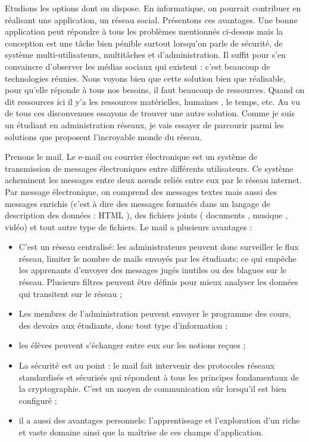 \documentclass[a4paper,12pt,french]{report} %
\begin{document}
	Etudions les options dont on dispose. En informatique, on pourrait contribuer en réalisant une application, un réseau social.
Présentons ces avantages. Une bonne application peut répondre à tous les problèmes mentionnés ci-dessus mais la conception est une tâche bien pénible surtout lorsqu'on parle de sécurité, de système multi-utilisateurs, multitâches et d'administration. Il suffit pour s'en convaincre d'observer les médias sociaux qui existent : c'est beaucoup %
de technologies réunies. Nous voyons bien que cette solution bien que réalisable, pour qu'elle réponde à tous nos besoins, il faut beaucoup de ressources. Quand on dit ressources ici il y'a les ressources matérielles, humaines , le temps, etc. Au vu de tous ces disconvenues essayons de trouver une autre solution. Comme je suis un étudiant en administration réseaux, je vais essayer de parcourir parmi les solutions que proposent l'incroyable monde du réseau.

	Prenons le mail. Le e-mail ou courrier électronique est un système de transmission de messages électroniques entre différents utilisateurs. Ce système acheminent les messages entre deux nœuds reliés entre eux par le réseau internet. Par message électronique, on comprend des messages textes mais aussi des messages enrichis (c'est à dire des messages formatés dans un langage de description des données : HTML \label{ref:html} ), des fichiers joints ( documents , musique , vidéo) et tout autre type de fichiers. Le mail a plusieurs avantages :
\begin{itemize}
	\item C'est un réseau centralisé: les administrateurs peuvent donc surveiller le flux réseau, limiter le nombre de mails envoyés par les étudiants; ce qui empêche les apprenants d'envoyer des messages jugés inutiles ou des blagues sur le réseau. Plusieurs filtres peuvent être définis pour mieux analyser les données qui transitent sur le réseau ;
	\item Les membres de l'administration  peuvent envoyer le programme des cours, des devoirs aux étudiants, donc tout type d'information ;
	\item les élèves peuvent s'échanger entre eux sur les notions reçues ; 
	\item La sécurité est au point : le mail fait intervenir des protocoles réseaux standardisés et sécurisés qui répondent à tous les principes fondamentaux de la cryptographie. C'est un moyen de communication sûr lorsqu'il est bien configuré ;
	\item il a aussi des avantages personnels: l'apprentissage et l'exploration d'un riche et vaste domaine ainsi que la maîtrise de ces champs d'application.
\end{itemize}
\end{document}
